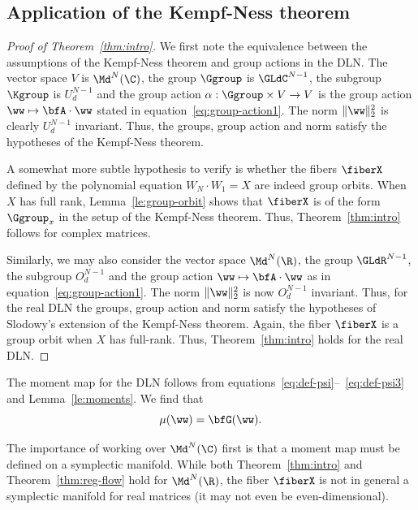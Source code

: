 \subsection{Application of the Kempf-Ness theorem}
\begin{proof}[Proof of Theorem~\ref{thm:intro}]
We first note the equivalence between the assumptions of the Kempf-Ness theorem and group actions in the DLN. The vector space $V$ is $\Md^N(\C)$, the group $\Ggroup$ is $\GLdC^{N-1}$, the subgroup $\Kgroup$ is $U_d^{N-1}$ and the group action $\alpha: \Ggroup \times V \to V$ is the group action $\ww \mapsto \bfA \cdot \ww$ stated in equation~\eqref{eq:group-action1}. The norm $\|\ww\|_2^2$ is clearly $U_d^{N-1}$ invariant.
Thus, the groups, group action and norm satisfy the hypotheses of the Kempf-Ness theorem.

A somewhat more subtle hypothesis to verify is whether the fibers $\fiberX$ defined by the polynomial equation $W_N\cdot W_1 =X$ are indeed group orbits. When $X$ has full rank, Lemma~\ref{le:group-orbit} shows that $\fiberX$ is of the form $\Ggroup_x$ in the setup of the Kempf-Ness theorem. Thus, Theorem~\ref{thm:intro} follows for complex matrices. 

Similarly, we may also consider the vector space $\Md^N(\R)$, the group $\GLdR^{N-1}$, the subgroup $O_d^{N-1}$ and the group action $\ww \mapsto \bfA \cdot \ww$ as in equation~\eqref{eq:group-action1}. The norm $\|\ww\|_2^2$ is now $O_d^{N-1}$ invariant.
Thus, for the real DLN the groups, group action and norm satisfy the hypotheses of Slodowy's extension of the Kempf-Ness theorem. Again, the fiber $\fiberX$ is a group orbit when $X$ has full-rank. Thus, Theorem~\ref{thm:intro} holds for the real DLN.
\end{proof}
\begin{remark}
The moment map for the DLN follows from equations~\eqref{eq:def-psi}--~\eqref{eq:def-psi3} and Lemma~\ref{le:moments}. We find that 
\begin{equation}
    \label{eq:moment-DLN}
    \mu(\ww) = \bfG(\ww).
\end{equation}

The importance of working over $\Md^N(\C)$ first is that a moment map must be defined on a symplectic manifold. While both Theorem~\ref{thm:intro} and Theorem~\ref{thm:reg-flow} hold for $\Md^N(\R)$, the fiber $\fiberX$ is not in general a symplectic manifold for real matrices (it may not even be even-dimensional).
\end{remark}

